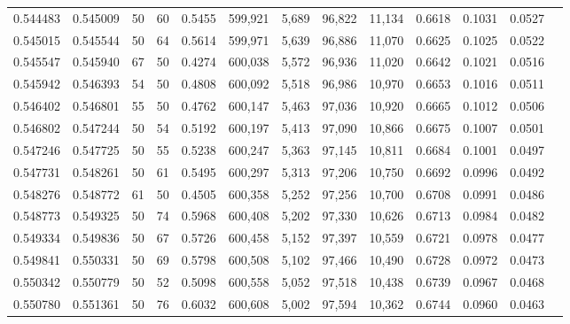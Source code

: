 \begin{tabular}{rrrrrrrrrrrrr}
0.544483 & 0.545009 &    50 &  60 &                                     0.5455 & 599,921 &   5,689 &  96,822 &  11,134 & 0.6618 & 0.1031 & 0.0527 \\
0.545015 & 0.545544 &    50 &  64 &                                     0.5614 & 599,971 &   5,639 &  96,886 &  11,070 & 0.6625 & 0.1025 & 0.0522 \\
0.545547 & 0.545940 &    67 &  50 &                                     0.4274 & 600,038 &   5,572 &  96,936 &  11,020 & 0.6642 & 0.1021 & 0.0516 \\
0.545942 & 0.546393 &    54 &  50 &                                     0.4808 & 600,092 &   5,518 &  96,986 &  10,970 & 0.6653 & 0.1016 & 0.0511 \\
0.546402 & 0.546801 &    55 &  50 &                                     0.4762 & 600,147 &   5,463 &  97,036 &  10,920 & 0.6665 & 0.1012 & 0.0506 \\
0.546802 & 0.547244 &    50 &  54 &                                     0.5192 & 600,197 &   5,413 &  97,090 &  10,866 & 0.6675 & 0.1007 & 0.0501 \\
0.547246 & 0.547725 &    50 &  55 &                                     0.5238 & 600,247 &   5,363 &  97,145 &  10,811 & 0.6684 & 0.1001 & 0.0497 \\
0.547731 & 0.548261 &    50 &  61 &                                     0.5495 & 600,297 &   5,313 &  97,206 &  10,750 & 0.6692 & 0.0996 & 0.0492 \\
0.548276 & 0.548772 &    61 &  50 &                                     0.4505 & 600,358 &   5,252 &  97,256 &  10,700 & 0.6708 & 0.0991 & 0.0486 \\
0.548773 & 0.549325 &    50 &  74 &                                     0.5968 & 600,408 &   5,202 &  97,330 &  10,626 & 0.6713 & 0.0984 & 0.0482 \\
0.549334 & 0.549836 &    50 &  67 &                                     0.5726 & 600,458 &   5,152 &  97,397 &  10,559 & 0.6721 & 0.0978 & 0.0477 \\
0.549841 & 0.550331 &    50 &  69 &                                     0.5798 & 600,508 &   5,102 &  97,466 &  10,490 & 0.6728 & 0.0972 & 0.0473 \\
0.550342 & 0.550779 &    50 &  52 &                                     0.5098 & 600,558 &   5,052 &  97,518 &  10,438 & 0.6739 & 0.0967 & 0.0468 \\
0.550780 & 0.551361 &    50 &  76 &                                     0.6032 & 600,608 &   5,002 &  97,594 &  10,362 & 0.6744 & 0.0960 & 0.0463 \\

\end{tabular}
